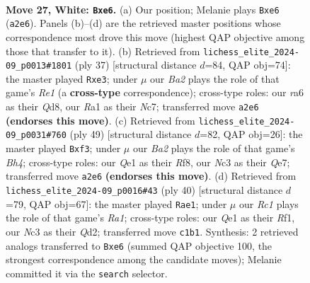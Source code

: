 \documentclass[11pt]{article}
\begin{document}
\clearpage

\begin{figure}[p]\centering
\begin{subfigure}{0.46\textwidth}\centering
\resizebox{\linewidth}{!}{%
\newchessgame
\chessboard[
  setfen={1n2r1k1/4qpp1/rp1pbn2/4p2p/P3P2N/2N3P1/B1P2P1P/R1R1Q1K1 w - - 15 27},
  showmover=false,
  pgfstyle=straightmove, color=movearrow, markmove={a2-e6}
]}
\caption{}
\end{subfigure}\hfill
\begin{subfigure}{0.46\textwidth}\centering
\resizebox{\linewidth}{!}{%
\newchessgame
\chessboard[
  setfen={r2qr1k1/1pn2ppp/2p2pb1/p7/2PP2P1/P2BRN1P/1P1Q1P2/3R2K1 b - - 0 19},
  showmover=false,
  pgfstyle=straightmove, color=movearrow, markmove={e8-e3}
]}
\caption{}
\end{subfigure}
\\[4pt]
\begin{subfigure}{0.46\textwidth}\centering
\resizebox{\linewidth}{!}{%
\newchessgame
\chessboard[
  setfen={3r1rk1/pp2qppp/2p1pn2/7b/2PP4/1PQ2N1P/P1B2PP1/4RK1R b - - 0 25},
  showmover=false,
  pgfstyle=straightmove, color=movearrow, markmove={h5-f3}
]}
\caption{}
\end{subfigure}\hfill
\begin{subfigure}{0.46\textwidth}\centering
\resizebox{\linewidth}{!}{%
\newchessgame
\chessboard[
  setfen={2r2rk1/p2qn2p/1p2pbp1/n2p4/3P1PP1/2N2N2/PP1Q1B1P/R4RK1 w - - 2 21},
  showmover=false,
  pgfstyle=straightmove, color=movearrow, markmove={a1-e1}
]}
\caption{}
\end{subfigure}
\caption{\textbf{Move 27, White: \texttt{Bxe6}.} (a) Our position; Melanie plays \texttt{Bxe6} (\texttt{a2e6}). Panels (b)--(d) are the retrieved master positions whose correspondence most drove this move (highest QAP objective among those that transfer to it). (b) Retrieved from \texttt{lichess\_elite\_2024-09\_p0013\#1801} (ply 37) [structural distance $d$=84, QAP obj=74]: the master played \texttt{Rxe3}; under $\mu$ our \emph{Ba2} plays the role of that game's \emph{Re1} (a \textbf{cross-type} correspondence); cross-type roles: our \emph{r}a6 as their \emph{Q}d8, our \emph{R}a1 as their \emph{N}c7; transferred move \texttt{a2e6} \textbf{(endorses this move)}. (c) Retrieved from \texttt{lichess\_elite\_2024-09\_p0031\#760} (ply 49) [structural distance $d$=82, QAP obj=26]: the master played \texttt{Bxf3}; under $\mu$ our \emph{Ba2} plays the role of that game's \emph{Bh4}; cross-type roles: our \emph{Q}e1 as their \emph{R}f8, our \emph{N}c3 as their \emph{Q}e7; transferred move \texttt{a2e6} \textbf{(endorses this move)}. (d) Retrieved from \texttt{lichess\_elite\_2024-09\_p0016\#43} (ply 40) [structural distance $d$=79, QAP obj=67]: the master played \texttt{Rae1}; under $\mu$ our \emph{Rc1} plays the role of that game's \emph{Ra1}; cross-type roles: our \emph{Q}e1 as their \emph{R}f1, our \emph{N}c3 as their \emph{Q}d2; transferred move \texttt{c1b1}. Synthesis: 2 retrieved analogs transferred to \texttt{Bxe6} (summed QAP objective 100, the strongest correspondence among the candidate moves); Melanie committed it via the \texttt{search} selector.}
\label{fig:thought-m52}
\end{figure}
\end{document}
